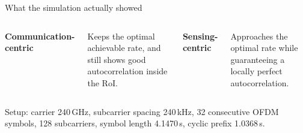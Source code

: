 \begin{frame}{What the simulation actually showed}
  \vspace{0.5em}
  \begin{columns}[T,onlytextwidth]
      {\small\textbf{\textcolor{ranblue}{Communication-centric}}\par}
      \vspace{0.4em}
      {\small Keeps the optimal achievable rate, and still shows good
       autocorrelation inside the RoI.\par}
      {\small\textbf{\textcolor{coreorange}{Sensing-centric}}\par}
      \vspace{0.4em}
      {\small Approaches the optimal rate while guaranteeing a locally perfect
       autocorrelation.\par}
  \end{columns}

  \vspace{0.9em}
  {\scriptsize\textcolor{softgray}{Setup: carrier 240\,GHz, subcarrier spacing 240\,kHz,
   32 consecutive OFDM symbols, 128 subcarriers, symbol length 4.1470\,\textmu s,
   cyclic prefix 1.0368\,\textmu s.}\par}

  \vspace{0.7em}
\end{frame}

